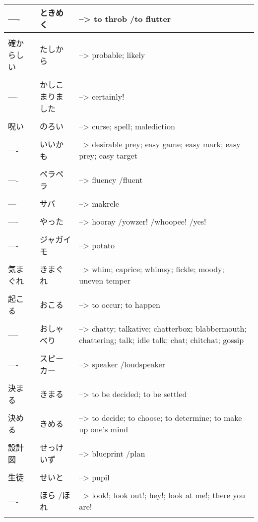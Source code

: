 \documentclass{article}
\begin{document}
\begin{tabular}{ l | l p{14cm}  }
---- & ときめく &--> to throb /to flutter \\ \hline\\[-1em]
確からしい & たしから &--> probable; likely \\ \hline\\[-1em]
---- & かしこまりました &--> certainly! \\ \hline\\[-1em]
呪い & のろい &--> curse; spell; malediction \\ \hline\\[-1em]
---- & いいかも &--> desirable prey; easy game; easy mark; easy prey; easy target \\ \hline\\[-1em]
---- & ペラペラ &--> fluency /fluent \\ \hline\\[-1em]
---- & サバ &--> makrele \\ \hline\\[-1em]
---- & やった  &--> hooray /yowzer! /whoopee! /yes! \\ \hline\\[-1em]
---- & ジャガイモ &--> potato \\ \hline\\[-1em]
気まぐれ & きまぐれ &--> whim; caprice; whimsy; fickle; moody; uneven temper \\ \hline\\[-1em]
起こる & おこる &--> to occur; to happen \\ \hline\\[-1em]
---- & おしゃべり &--> chatty; talkative; chatterbox; blabbermouth; chattering; talk; idle talk; chat; chitchat; gossip \\ \hline\\[-1em]
---- & スピーカー &--> speaker /loudspeaker \\ \hline\\[-1em]
決まる & きまる &--> to be decided; to be settled \\ \hline\\[-1em]
決める & きめる &--> to decide; to choose; to determine; to make up one's mind \\ \hline\\[-1em]
設計図 & せっけいず &--> blueprint /plan \\ \hline\\[-1em]
生徒 & せいと &--> pupil \\ \hline\\[-1em]
---- & ほら /ほれ &--> look!; look out!; hey!; look at me!; there you are! \\ \hline\\[-1em]

\end{tabular}
\end{document}
